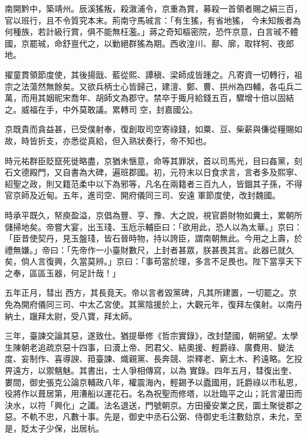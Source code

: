 \begin{pinyinscope}
 南開黔中，築靖州。辰溪猺叛，殺漵浦令，京重為賞，募殺一首領者賜之絹三百，官以班行，且不令質究本末。荊南守馬珹言：「有生猺，有省地猺，
 今未知叛者為何種族，若計級行賞，俱不能無枉濫。」蔣之奇知樞密院，恐忤京意，白言珹不體國，京罷珹，命舒亶代之，以勦絕群猺為期。西收湟川、鄯、廓，取䍧牱、夜郎地。



 擢童貫領節度使，其後揚戩、藍從熙、譚稹、梁師成皆踵之。凡寄資一切轉行，祖宗之法蕩然無餘矣。又欲兵柄士心皆歸己，建澶、鄭、曹、拱州為四輔，各屯兵二萬，而用其姻昵宋喬年、胡師文為郡守。禁卒于掫月給錢五百，驟增十倍以固結之。威福在手，中外莫敢議。累轉司
 空，封嘉國公。



 京既貴而貪益甚，已受僕射奉，復創取司空寄祿錢，如粟、豆、柴薪與傔從糧賜如故，時皆折支，亦悉從真給，但入熟狀奏行，帝不知也。



 時元祐群臣貶竄死徙略盡，京猶未愜意，命等其罪狀，首以司馬光，目曰姦黨，刻石文德殿門，又自書為大碑，遍班郡國。初，元符末以日食求言，言者多及熙寧、紹聖之政，則又籍范柔中以下為邪等，凡名在兩籍者三百九人，皆錮其子孫，不得官京師及近甸。五年，進司空、開府儀同三司、安遠
 軍節度使，改封魏國。



 時承平既久，帑庾盈溢，京倡為豐、亨、豫、大之說，視官爵財物如糞土，累朝所儲掃地矣。帝嘗大宴，出玉琖、玉卮示輔臣曰：「欲用此，恐人以為太華。」京曰：「臣昔使契丹，見玉盤琖，皆石晉時物，持以誇臣，謂南朝無此。今用之上壽，於禮無嫌。」帝曰：「先帝作一小臺財數尺，上封者甚眾，朕甚畏其言。此器已就久矣，倘人言復興，久當莫辨。」京曰：「事苟當於理，多言不足畏也。陛下當享天下之奉，區區玉器，何足計哉！」



 五年正月，彗出
 西方，其長竟天。帝以言者毀黨碑，凡其所建置，一切罷之。京免為開府儀同三司、中太乙宮使。其黨陰援於上，大觀元年，復拜左僕射。以南丹納土，躐拜太尉，受八寶，拜太師。



 三年，臺諫交論其惡，遂致仕。猶提舉修《哲宗實錄》，改封楚國，朝朔望。太學生陳朝老追疏京惡十四事，曰瀆上帝、罔君父、結奧援、輕爵祿、廣費用、變法度、妄制作、喜導諛、箝臺諫、熾親黨、長奔競、崇釋老、窮土木、矜遠略。乞投畀遠方，以禦魑魅。其書出，士人爭相傳寫，以為
 實錄。四年五月，彗復出奎、婁間，御史張克公論京輔政八年，權震海內，輕錫予以蠹國用，託爵祿以市私恩，役將作以葺居第，用漕船以運花石。名為祝聖而修塔，以壯臨平之山；託言灌田而決水，以符「興化」之讖。法名退送，門號朝京。方田擾安業之民，圜土聚徙郡之惡。不軌不忠，凡數十事。先是，御史中丞石公弼、侍御史毛注數劾京，未允，至是，貶太子少保，出居杭。




\end{pinyinscope}
